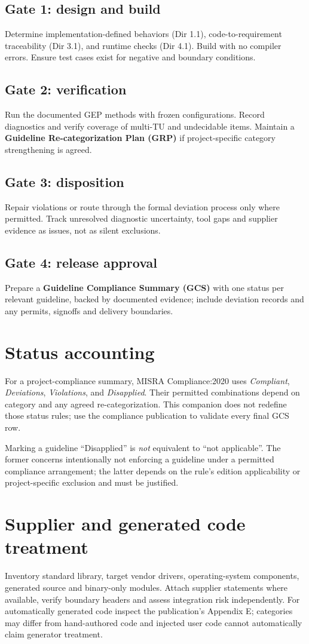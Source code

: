\documentclass[10pt,letterpaper]{article}
\begin{document}
\subsection{Gate 1: design and build}
Determine implementation-defined behaviors (Dir 1.1), code-to-requirement traceability (Dir 3.1), and runtime checks (Dir 4.1). Build with no compiler errors. Ensure test cases exist for negative and boundary conditions.
\subsection{Gate 2: verification}
Run the documented GEP methods with frozen configurations. Record diagnostics and verify coverage of multi-TU and undecidable items. Maintain a \textbf{Guideline Re-categorization Plan (GRP)} if project-specific category strengthening is agreed.
\subsection{Gate 3: disposition}
Repair violations or route through the formal deviation process only where permitted. Track unresolved diagnostic uncertainty, tool gaps and supplier evidence as issues, not as silent exclusions.
\subsection{Gate 4: release approval}
Prepare a \textbf{Guideline Compliance Summary (GCS)} with one status per relevant guideline, backed by documented evidence; include deviation records and any permits, signoffs and delivery boundaries.
\section{Status accounting}
For a project-compliance summary, MISRA Compliance:2020 uses \emph{Compliant}, \emph{Deviations}, \emph{Violations}, and \emph{Disapplied}. Their permitted combinations depend on category and any agreed re-categorization. This companion does not redefine those status rules; use the compliance publication to validate every final GCS row.
\begin{riskbox}Marking a guideline ``Disapplied'' is \emph{not} equivalent to ``not applicable''. The former concerns intentionally not enforcing a guideline under a permitted compliance arrangement; the latter depends on the rule's edition applicability or project-specific exclusion and must be justified.\end{riskbox}
\section{Supplier and generated code treatment}
Inventory standard library, target vendor drivers, operating-system components, generated source and binary-only modules. Attach supplier statements where available, verify boundary headers and assess integration risk independently. For automatically generated code inspect the publication's Appendix E; categories may differ from hand-authored code and injected user code cannot automatically claim generator treatment.
\end{document}
